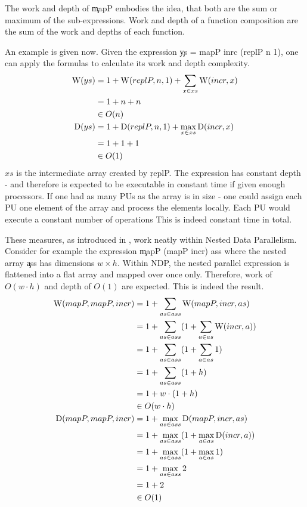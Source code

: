   The work and depth of \c{mapP} embodies the idea,
  that both are the sum or maximum of the sub-expressions.
  Work and depth of a function composition are the sum of the
  work and depths of each function.
  
  An example is given now. Given the expression
  \c{ys = mapP inrc (replP n 1)}, one can apply
  the formulas to calculate its work and depth complexity.
  \begin{equation*}
  \begin{split}
  \textrm{W}(ys)
        & = 1 + \textrm{W}(replP,n,1) + \sum_{x \in xs}\textrm{W}(incr,x) \\
        & = 1 + n + n \\
        & \in O(n) \\
  \textrm{D}(ys) & = 1 + \textrm{D}(replP,n,1) + \max_{x \in xs}\textrm{D}(incr,x) \\
      & = 1 + 1 + 1 \\
      & \in O(1) \\
  \end{split}
  \end{equation*}
  $xs$ is the intermediate array created by \c{replP}.
  The expression has constant depth - and therefore
  is expected to be executable in constant time if given enough processors.
  If one had as many PUs as the array is in size
  - one could assign each PU one element of the array and process
  the elements locally. Each PU would execute a constant number of operations
  This is indeed constant time in total.
  
  These measures, as introduced in \cite{Belloch1996}, work
  neatly within Nested Data Parallelism. Consider for example the
  expression \c{mapP (mapP incr) ass} where the
  nested array \c{ass} has dimensions $w \times h$.
  Within NDP, the nested parallel expression is flattened into a
  flat array and mapped over once only.
  Therefore, work of $O(w \cdot h)$ and depth of $O(1)$ are expected.
  This is indeed the result.
  \begin{equation*}
  \begin{split}
  \textrm{W}(mapP,mapP,incr)
        & = 1 + \sum_{as \in ass}\textrm{W}(mapP,incr,as) \\
        & = 1 + \sum_{as \in ass}(1 + \sum_{a \in as} \textrm{W}(incr,a)) \\
        & = 1 + \sum_{as \in ass}(1 + \sum_{a \in as} 1) \\
        & = 1 + \sum_{as \in ass}(1 + h) \\
        & = 1 + w \cdot (1 + h) \\
        & \in O(w \cdot h) \\
  \textrm{D}(mapP,mapP,incr) & = 1 + \max_{as \in ass}\textrm{D}(mapP,incr,as) \\
        & = 1 + \max_{as \in ass}(1 + \max_{a \in as} \textrm{D}(incr,a)) \\
        & = 1 + \max_{as \in ass}(1 + \max_{a \in as} 1) \\
        & = 1 + \max_{as \in ass}2 \\
        & = 1 + 2 \\
        & \in O(1) \\
  \end{split}
  \end{equation*}
  
